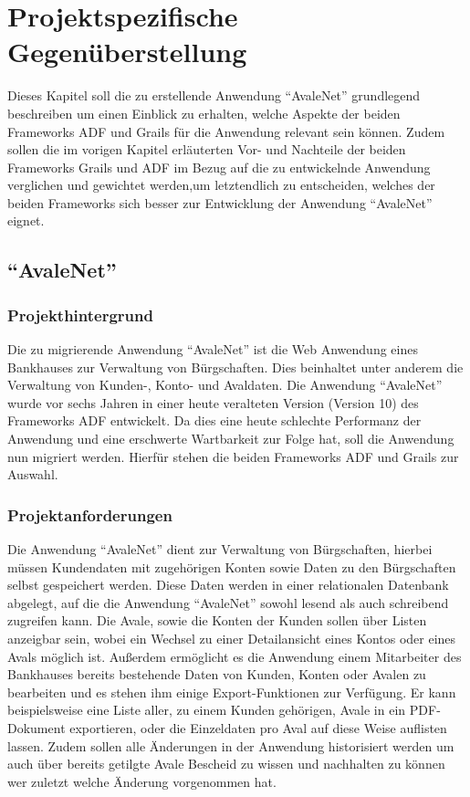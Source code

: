 \section{Projektspezifische Gegenüberstellung}
Dieses Kapitel soll die zu erstellende Anwendung "`AvaleNet"' grundlegend beschreiben um einen Einblick zu erhalten, welche Aspekte der beiden Frameworks ADF und Grails für die Anwendung relevant sein können. Zudem sollen die im vorigen Kapitel erläuterten Vor- und Nachteile der beiden Frameworks Grails und ADF im Bezug auf die zu entwickelnde Anwendung verglichen und gewichtet werden,um letztendlich zu entscheiden, welches der beiden Frameworks sich besser zur Entwicklung der Anwendung "`AvaleNet"' eignet.
\subsection{"`AvaleNet"'}
\subsubsection{Projekthintergrund}
Die zu migrierende Anwendung "`AvaleNet"' ist die Web Anwendung eines Bankhauses zur Verwaltung von Bürgschaften. Dies beinhaltet unter anderem die Verwaltung von Kunden-, Konto- und Avaldaten. Die Anwendung "`AvaleNet"' wurde vor sechs Jahren in einer heute veralteten Version (Version 10) des Frameworks ADF entwickelt. Da dies eine heute schlechte Performanz der Anwendung und eine erschwerte Wartbarkeit zur Folge hat, soll die Anwendung nun migriert werden. Hierfür stehen die beiden Frameworks ADF und Grails zur Auswahl.
\subsubsection{Projektanforderungen}
Die Anwendung "`AvaleNet"' dient zur Verwaltung von Bürgschaften, hierbei müssen Kundendaten mit zugehörigen Konten sowie Daten zu den Bürgschaften selbst gespeichert werden. Diese Daten werden in einer relationalen Datenbank abgelegt, auf die die Anwendung "`AvaleNet"' sowohl lesend als auch schreibend zugreifen kann. Die Avale, sowie die Konten der Kunden sollen über Listen anzeigbar sein, wobei ein Wechsel zu einer Detailansicht eines Kontos oder eines Avals möglich ist. Außerdem ermöglicht es die Anwendung einem Mitarbeiter des Bankhauses bereits bestehende Daten von Kunden, Konten oder Avalen zu bearbeiten und es stehen ihm einige Export-Funktionen zur Verfügung. Er kann beispielsweise eine Liste aller, zu einem Kunden gehörigen, Avale in ein PDF-Dokument exportieren, oder die Einzeldaten pro Aval auf diese Weise auflisten lassen. Zudem sollen alle Änderungen in der Anwendung historisiert werden um auch über bereits getilgte Avale Bescheid zu wissen und nachhalten zu können wer zuletzt welche Änderung vorgenommen hat.

